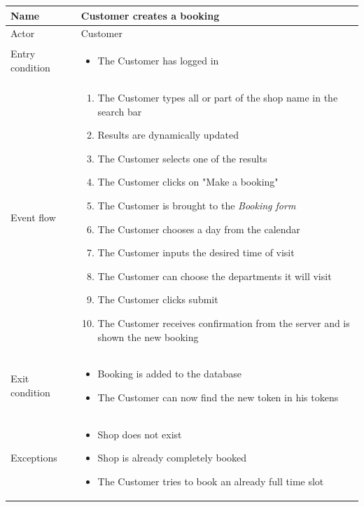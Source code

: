 \begin{table}[H]
    \begin{tabu} to \textwidth {|X|X[4]|}
        \hline
        Name            & Customer creates a booking \\ \hline
        Actor           & Customer                   \\ \hline
        Entry condition & \begin{itemize}
            \item The Customer has logged in
        \end{itemize} \\ \hline
        Event flow      & \begin{enumerate}
            \item The Customer types all or part of the shop name in the search bar
            \item Results are dynamically updated
            \item The Customer selects one of the results
            \item The Customer clicks on "Make a booking"
            \item The Customer is brought to the \emph{Booking form}
            \item The Customer chooses a day from the calendar
            \item The Customer inputs the desired time of visit
            \item The Customer can choose the departments it will visit
            \item The Customer clicks submit
            \item The Customer receives confirmation from the server and is shown the new booking
        \end{enumerate} \\ \hline
        Exit condition  & \begin{itemize}
            \item Booking is added to the database
            \item The Customer can now find the new token in his tokens
        \end{itemize} \\ \hline
        Exceptions      & \begin{itemize}
            \item Shop does not exist
            \item Shop is already completely booked
            \item The Customer tries to book an already full time slot
        \end{itemize} \\ \hline
    \end{tabu}
\end{table}

